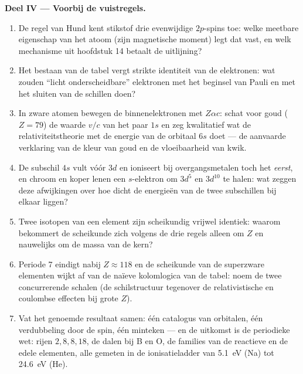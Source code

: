 \begin{problem}
\medskip\noindent\textbf{Deel IV --- Voorbij de vuistregels.}
\begin{enumerate}[resume]
  \item De regel van Hund kent stikstof drie evenwijdige $2p$-spins toe:
        welke meetbare eigenschap van het atoom (zijn magnetische moment)
        legt dat vast, en welk mechanisme uit hoofdstuk 14 betaalt de
        uitlijning?
  \item Het bestaan van de tabel vergt strikte identiteit van de
        elektronen: wat zouden ``licht onderscheidbare'' elektronen met
        het beginsel van Pauli en met het sluiten van de schillen doen?
  \item In zware atomen bewegen de binnenelektronen met $Z\alpha c$:
        schat voor goud ($Z = 79$) de waarde $v/c$ van het paar $1s$ en
        zeg kwalitatief wat de relativiteitstheorie met de energie van de
        orbitaal $6s$ doet --- de aanvaarde verklaring van de kleur van
        goud en de vloeibaarheid van kwik.
  \item De subschil $4s$ vult vóór $3d$ en ioniseert bij
        overgangsmetalen toch het \emph{eerst}, en chroom en koper lenen
        een $s$-elektron om $3d^5$ en $3d^{10}$ te halen: wat zeggen deze
        afwijkingen over hoe dicht de energieën van de twee subschillen
        bij elkaar liggen?
  \item Twee isotopen van een element zijn scheikundig vrijwel identiek:
        waarom bekommert de scheikunde zich volgens de drie regels alleen
        om $Z$ en nauwelijks om de massa van de kern?
  \item Periode 7 eindigt nabij $Z \approx 118$ en de scheikunde van de
        superzware elementen wijkt af van de naïeve kolomlogica van de
        tabel: noem de twee concurrerende schalen (de schilstructuur
        tegenover de relativistische en coulombse effecten bij grote
        $Z$).
  \item Vat het genoemde resultaat samen: één catalogus van orbitalen,
        één verdubbeling door de spin, één minteken --- en de uitkomst is
        de periodieke wet: rijen $2, 8, 8, 18$, de dalen bij B en O, de
        families van de reactieve en de edele elementen, alle gemeten in
        de ionisatieladder van \qty{5.1}{eV} (Na) tot \qty{24.6}{eV}
        (He).
\end{enumerate}
\end{problem}
